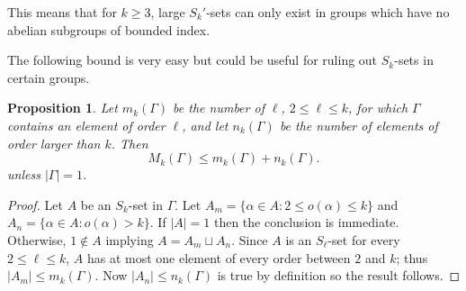 \documentclass[12pt]{article}
\newtheorem{prop}{Proposition}
\def\john#1{\noindent
\textcolor{green}
{\textsc{(John:}
\textsf{#1})}}
\begin{document}
This means that for $k\ge 3$, large $S_k'$-sets can only exist in groups which have no abelian subgroups of bounded index. 

The following bound is very easy but could be useful for ruling out $S_k$-sets in certain groups.


\begin{prop}
    Let $m_k(\Gamma)$ be the number of $\ell$, $2\le\ell\le k$, for which $\Gamma$ contains an element of order $\ell$, and let $n_k(\Gamma)$ be the number of elements of order larger than $k$. Then
    $$M_k(\Gamma)\le m_k(\Gamma)+n_k(\Gamma).$$
    unless $|\Gamma|=1$.
\end{prop}
\begin{proof}
    Let $A$ be an $S_k$-set in $\Gamma$. Let $A_m=\{\alpha\in A:2\le o(\alpha)\le k\}$ and $A_n=\{\alpha\in A:o(\alpha)>k\}$. If $|A|=1$ then the conclusion is immediate. Otherwise, $1\not\in A$ implying $A=A_m\sqcup A_n$. Since $A$ is an $S_\ell$-set for every $2\le\ell\le k$, $A$ has at most one element of every order between $2$ and $k$; thus $|A_m|\le m_k(\Gamma)$. Now $|A_n|\le n_k(\Gamma)$ is true by definition so the result follows.
\end{proof}
\end{document}
